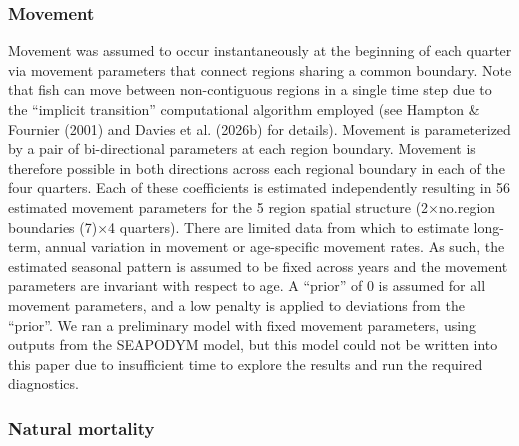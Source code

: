 \documentclass[
  english,
  a4paper,
  a4paper,
  11pt]{SCreport}
\begin{document}
\subsubsection{Movement}\label{sec-model-movement}

Movement was assumed to occur instantaneously at the beginning of each
quarter via movement parameters that connect regions sharing a common
boundary. Note that fish can move between non-contiguous regions in a
single time step due to the ``implicit transition'' computational
algorithm employed (see Hampton \& Fournier (2001) and Davies et al.
(2026b) for details). Movement is parameterized by a pair of
bi-directional parameters at each region boundary. Movement is therefore
possible in both directions across each regional boundary in each of the
four quarters. Each of these coefficients is estimated independently
resulting in 56 estimated movement parameters for the 5 region spatial
structure (2×no.region boundaries (7)×4 quarters). There are limited
data from which to estimate long-term, annual variation in movement or
age-specific movement rates. As such, the estimated seasonal pattern is
assumed to be fixed across years and the movement parameters are
invariant with respect to age. A ``prior'' of 0 is assumed for all
movement parameters, and a low penalty is applied to deviations from the
``prior''. We ran a preliminary model with fixed movement parameters,
using outputs from the SEAPODYM model, but this model could not be
written into this paper due to insufficient time to explore the results
and run the required diagnostics.

\subsubsection{Natural mortality}\label{sec-model-natmort}
\end{document}
